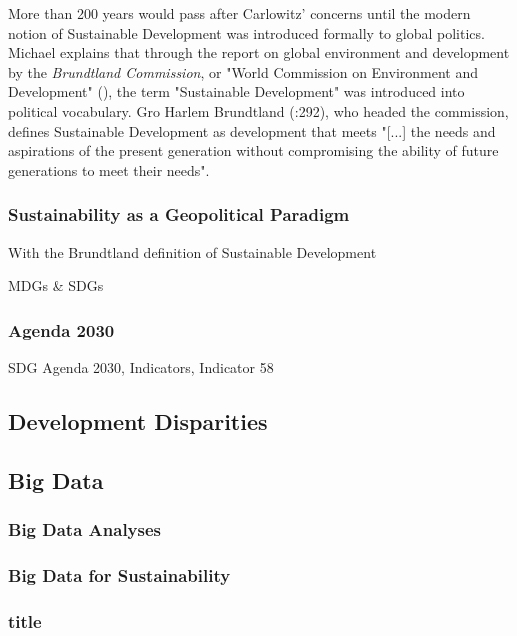 		        More than 200 years would pass after Carlowitz' concerns until the modern notion of Sustainable Development was introduced formally to global politics. Michael \citet{redclift2005} explains that through the report on global environment and development by the \textit{Brundtland Commission}, or "World Commission on Environment and Development" (\citeyear{wced1987}), the term "Sustainable Development" was introduced into political vocabulary. Gro Harlem Brundtland (\citeyear{brundtland1987}:292),  who headed the commission, defines Sustainable Development as development that meets "[...] the needs and aspirations of the present generation without compromising the ability of future generations to meet their needs".
		        
		        
		    
		    \subsubsection{Sustainability as a Geopolitical Paradigm}
		        With the Brundtland definition of Sustainable Development 
		        
		        MDGs & SDGs
		        
		    
		    \subsubsection{Agenda 2030}
		        SDG Agenda 2030, Indicators, Indicator 58
		
		
		\subsection{Development Disparities}
		
		
		
		\subsection{Big Data}
			\subsubsection{Big Data Analyses}
			
			\subsubsection{Big Data for Sustainability}
			
			\subsubsection{title}
			
